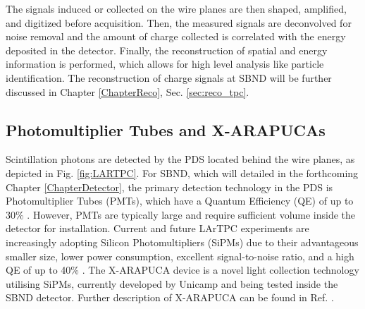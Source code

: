 The signals induced or collected on the wire planes are then shaped, amplified, and digitized before acquisition.
Then, the measured signals are deconvolved for noise removal and the amount of charge collected is correlated with the energy deposited in the detector.
Finally, the reconstruction of spatial and energy information is performed, which allows for high level analysis like particle identification.
The reconstruction of charge signals at SBND will be further discussed in Chapter \ref{ChapterReco}, Sec. \ref{sec:reco_tpc}.

\subsection{Photomultiplier Tubes and X-ARAPUCAs}
\label{sec:pmtarapuca}

Scintillation photons are detected by the PDS located behind the wire planes, as depicted in Fig. \ref{fig:LARTPC}. 
For SBND, which will detailed in the forthcoming Chapter \ref{ChapterDetector}, the primary detection technology in the PDS is Photomultiplier Tubes (PMTs), which have a Quantum Efficiency (QE) of up to 30\% \cite{pmt_qe}.
However, PMTs are typically large and require sufficient volume inside the detector for installation. 
Current and future LArTPC experiments are increasingly adopting Silicon Photomultipliers (SiPMs) due to their advantageous smaller size, lower power consumption, excellent signal-to-noise ratio, and a high QE of up to 40\% \cite{sipm_qe}.
The X-ARAPUCA device is a novel light collection technology utilising SiPMs, currently developed by Unicamp and being tested inside the SBND detector. 
Further description of X-ARAPUCA can be found in Ref. \cite{xarapuca}.

%

